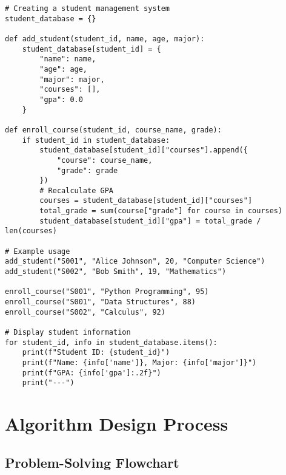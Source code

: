 \documentclass[12pt,a4paper]{article}
\begin{document}
\begin{codebox}{}
\begin{lstlisting}[style=python]
# Creating a student management system
student_database = {}

def add_student(student_id, name, age, major):
    student_database[student_id] = {
        "name": name,
        "age": age,
        "major": major,
        "courses": [],
        "gpa": 0.0
    }

def enroll_course(student_id, course_name, grade):
    if student_id in student_database:
        student_database[student_id]["courses"].append({
            "course": course_name,
            "grade": grade
        })
        # Recalculate GPA
        courses = student_database[student_id]["courses"]
        total_grade = sum(course["grade"] for course in courses)
        student_database[student_id]["gpa"] = total_grade / len(courses)

# Example usage
add_student("S001", "Alice Johnson", 20, "Computer Science")
add_student("S002", "Bob Smith", 19, "Mathematics")

enroll_course("S001", "Python Programming", 95)
enroll_course("S001", "Data Structures", 88)
enroll_course("S002", "Calculus", 92)

# Display student information
for student_id, info in student_database.items():
    print(f"Student ID: {student_id}")
    print(f"Name: {info['name']}, Major: {info['major']}")
    print(f"GPA: {info['gpa']:.2f}")
    print("---")
\end{lstlisting}
\end{codebox}

\section{Algorithm Design Process}

\subsection{Problem-Solving Flowchart}
\end{document}
